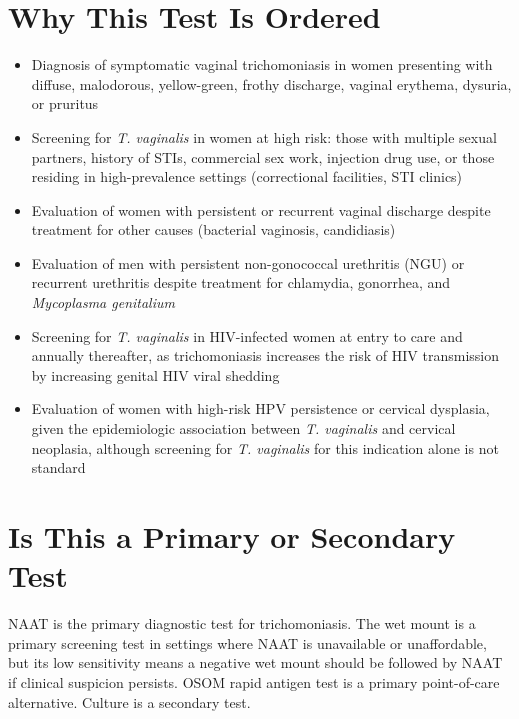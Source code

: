 \section*{Why This Test Is Ordered}
\begin{itemize}
  \item Diagnosis of symptomatic vaginal trichomoniasis in women presenting with diffuse, malodorous, yellow-green, frothy discharge, vaginal erythema, dysuria, or pruritus
  \item Screening for \textit{T. vaginalis} in women at high risk: those with multiple sexual partners, history of STIs, commercial sex work, injection drug use, or those residing in high-prevalence settings (correctional facilities, STI clinics)
  \item Evaluation of women with persistent or recurrent vaginal discharge despite treatment for other causes (bacterial vaginosis, candidiasis)
  \item Evaluation of men with persistent non-gonococcal urethritis (NGU) or recurrent urethritis despite treatment for chlamydia, gonorrhea, and \textit{Mycoplasma genitalium}
  \item Screening for \textit{T. vaginalis} in HIV-infected women at entry to care and annually thereafter, as trichomoniasis increases the risk of HIV transmission by increasing genital HIV viral shedding
  \item Evaluation of women with high-risk HPV persistence or cervical dysplasia, given the epidemiologic association between \textit{T. vaginalis} and cervical neoplasia, although screening for \textit{T. vaginalis} for this indication alone is not standard
\end{itemize}

\section*{Is This a Primary or Secondary Test}
NAAT is the primary diagnostic test for trichomoniasis. The wet mount is a primary screening test in settings where NAAT is unavailable or unaffordable, but its low sensitivity means a negative wet mount should be followed by NAAT if clinical suspicion persists. OSOM rapid antigen test is a primary point-of-care alternative. Culture is a secondary test.

